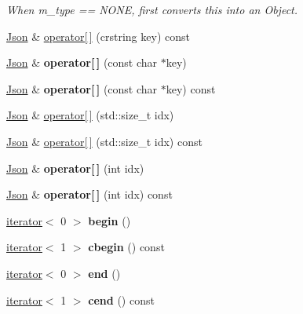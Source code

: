 \begin{DoxyCompactItemize}
\begin{DoxyCompactList}\small\item\em When m\+\_\+type == N\+O\+NE, first converts this into an Object. \end{DoxyCompactList}\item 
\hyperlink{classnta_1_1utils_1_1Json}{Json} \& \hyperlink{classnta_1_1utils_1_1Json_ab3b51a07ebed90330c98fd8e20785781}{operator\mbox{[}$\,$\mbox{]}} (crstring key) const
\item 
\mbox{\label{classnta_1_1utils_1_1Json_a4dcba3e4e113c3204212fea031725c9c}} 
\hyperlink{classnta_1_1utils_1_1Json}{Json} \& {\bfseries operator\mbox{[}$\,$\mbox{]}} (const char $\ast$key)
\item 
\mbox{\label{classnta_1_1utils_1_1Json_adf46f886ad73e0cacb7d0e5cc40841b3}} 
\hyperlink{classnta_1_1utils_1_1Json}{Json} \& {\bfseries operator\mbox{[}$\,$\mbox{]}} (const char $\ast$key) const
\item 
\hyperlink{classnta_1_1utils_1_1Json}{Json} \& \hyperlink{classnta_1_1utils_1_1Json_a236b5885612b74c21fbad169b21eaf55}{operator\mbox{[}$\,$\mbox{]}} (std\+::size\+\_\+t idx)
\item 
\hyperlink{classnta_1_1utils_1_1Json}{Json} \& \hyperlink{classnta_1_1utils_1_1Json_a893f191111e604995488d147aaa711f8}{operator\mbox{[}$\,$\mbox{]}} (std\+::size\+\_\+t idx) const
\item 
\mbox{\label{classnta_1_1utils_1_1Json_a7d094a2061036a579a63923ae30171a4}} 
\hyperlink{classnta_1_1utils_1_1Json}{Json} \& {\bfseries operator\mbox{[}$\,$\mbox{]}} (int idx)
\item 
\mbox{\label{classnta_1_1utils_1_1Json_aba70b2f342f889783480ef72c606b240}} 
\hyperlink{classnta_1_1utils_1_1Json}{Json} \& {\bfseries operator\mbox{[}$\,$\mbox{]}} (int idx) const
\item 
\mbox{\label{classnta_1_1utils_1_1Json_a9f001e2bb1883915bee5fa9a0df8258b}} 
\hyperlink{classnta_1_1utils_1_1Json_1_1iterator}{iterator}$<$ 0 $>$ {\bfseries begin} ()
\item 
\mbox{\label{classnta_1_1utils_1_1Json_a712d6d5350c2390677e3aab6b9ce2b80}} 
\hyperlink{classnta_1_1utils_1_1Json_1_1iterator}{iterator}$<$ 1 $>$ {\bfseries cbegin} () const
\item 
\mbox{\label{classnta_1_1utils_1_1Json_a37ac10b5f6baad85be2625c1efbccf74}} 
\hyperlink{classnta_1_1utils_1_1Json_1_1iterator}{iterator}$<$ 0 $>$ {\bfseries end} ()
\item 
\mbox{\label{classnta_1_1utils_1_1Json_a58fc30fc1f2e1498093070c848f63847}} 
\hyperlink{classnta_1_1utils_1_1Json_1_1iterator}{iterator}$<$ 1 $>$ {\bfseries cend} () const
\end{DoxyCompactItemize}
